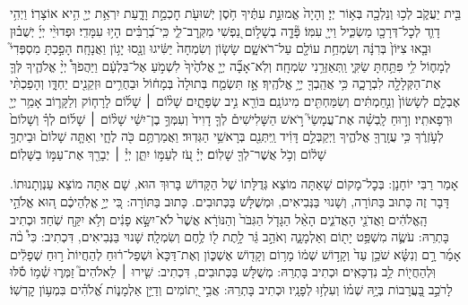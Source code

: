 \begin{footnotesize}
	בֵּ֖ית יַעֲקֹ֑ב לְכ֥וּ וְנֵלְכָ֖ה בְּא֥וֹר יְיָ׃
	וְהָיָה֙ אֱמוּנַ֣ת עִתֶּ֔יךָ חֹ֥סֶן יְשׁוּעֹ֖ת חׇכְמַ֣ת וָדָ֑עַת יִרְאַ֥ת יְיָ֖ הִ֥יא אוֹצָרֽוֹ׃
	וַיְהִ֥י דָוִ֛ד לְכׇל־דְּרָכָ֖ו מַשְׂכִּ֑יל וַייָ֖ עִמּֽוֹ׃
	פָּ֘דָ֤ה בְשָׁל֣וֹם נַ֭פְשִׁי מִקְּרׇב־לִ֑י כִּֽי־בְ֝רַבִּ֗ים הָי֥וּ עִמָּדִֽי׃
	וּפְדוּיֵ֨י יְיָ֜ יְשֻׁב֗וּן וּבָ֤אוּ צִיּוֹן֙ בְּרִנָּ֔ה וְשִׂמְחַ֥ת עוֹלָ֖ם עַל־רֹאשָׁ֑ם שָׂשׂ֤וֹן וְשִׂמְחָה֙ יַשִּׂ֔יגוּ וְנָ֖סוּ יָג֥וֹן וַאֲנָחָֽה׃
	הָפַ֣כְתָּ מִסְפְּדִי֮ לְמָח֢וֹל לִ֥י פִּתַּ֥חְתָּ שַׂקִּ֑י וַֽתְּאַזְּרֵ֥נִי שִׂמְחָֽה׃
	וְלֹֽא־אָבָ֞ה יְיָ֤ אֱלֹהֶ֙יךָ֙ לִשְׁמֹ֣עַ אֶל־בִּלְעָ֔ם וַיַּהֲפֹךְ֩ יְיָ֨ אֱלֹהֶ֧יךָ לְּךָ֛ אֶת־הַקְּלָלָ֖ה לִבְרָכָ֑ה כִּ֥י אֲהֵֽבְךָ֖ יְיָ֥ אֱלֹהֶֽיךָ׃
	אָ֣ז תִּשְׂמַ֤ח בְּתוּלָה֙ בְּמָח֔וֹל וּבַחֻרִ֥ים וּזְקֵנִ֖ים יַחְדָּ֑ו וְהָפַכְתִּ֨י אֶבְלָ֤ם לְשָׂשׂוֹן֙ וְנִ֣חַמְתִּ֔ים וְשִׂמַּחְתִּ֖ים מִיגוֹנָֽם׃
	בּוֹרֵ֖א נִ֣יב שְׂפָתָ֑יִם שָׁל֨וֹם ׀ שָׁל֜וֹם לָרָח֧וֹק וְלַקָּר֛וֹב אָמַ֥ר יְיָ֖ וּרְפָאתִֽיו׃
	וְר֣וּחַ לָֽבְשָׁ֗ה אֶת־עֲמָשַׂי֮ רֹ֣אשׁ הַשָּׁלִישִׁים֒ לְךָ֤ דָוִיד֙ וְעִמְּךָ֣ בֶן־יִשַׁ֔י שָׁל֨וֹם ׀ שָׁל֜וֹם לְךָ֗ וְשָׁלוֹם֙ לְעֹ֣זְרֶ֔ךָ כִּ֥י עֲזָֽרְךָ֖ אֱלֹהֶ֑יךָ וַיְקַבְּלֵ֣ם דָּוִ֔יד וַֽיִּתְּנֵ֖ם בְּרָאשֵׁ֥י הַגְּדֽוּד׃
	וַאֲמַרְתֶּ֥ם כֹּ֖ה לֶחָ֑י וְאַתָּ֤ה שָׁלוֹם֙ וּבֵיתְךָ֣ שָׁל֔וֹם וְכֹ֥ל אֲשֶׁר־לְךָ֖ שָׁלֽוֹם׃
	יְיָ֗ עֹ֭ז לְעַמּ֣וֹ יִתֵּ֑ן יְיָ֓ ׀ יְבָרֵ֖ךְ אֶת־עַמּ֣וֹ בַשָּׁלֽוֹם׃
	
	אָמַר רַבִּי יוֹחָנָן: בְּכׇל־מָקוֹם שָׁאַתָּה מוֹצֵא גְּדֻלָּתוֹ שֶׁל הַקָּדוֹשׁ בָּרוּךְ הוּא, שָׁם אַתָּה מוֹצֵא עַנְוְתָנוּתוֹ. דָּבָר זֶה כָּתוּב בַּתּוֹרָה, וְשָׁנוּי בַּנְּבִיאִים, וּמְשֻׁלָּשׁ בַּכְּתוּבִים. כָּתוּב בַּתּוֹרָה:%
	כִּ֚י יְיָ֣ אֱלֹֽהֵיכֶ֔ם ה֚וּא אֱלֹהֵ֣י הָֽאֱלֹהִ֔ים וַאֲדֹנֵ֖י הָאֲדֹנִ֑ים הָאֵ֨ל הַגָּדֹ֤ל הַגִּבֹּר֙ וְהַנּוֹרָ֔א אֲשֶׁר֙ לֹא־יִשָּׂ֣א פָנִ֔ים וְלֹ֥א יִקַּ֖ח שֹֽׁחַד׃
	וּכְתִיב בָּתְרֵהּ:
	עֹשֶׂ֛ה מִשְׁפַּ֥ט יָת֖וֹם וְאַלְמָנָ֑ה וְאֹהֵ֣ב גֵּ֔ר לָ֥תֶת ל֖וֹ לֶ֥חֶם וְשִׂמְלָֽה׃
	שָׁנוּי בַּנְּבִיאִים, דִּכְתִיב:%
	כִּי֩ כֹ֨ה אָמַ֜ר רָ֣ם וְנִשָּׂ֗א שֹׁכֵ֥ן עַד֙ וְקָד֣וֹשׁ שְׁמ֔וֹ מָר֥וֹם וְקָד֖וֹשׁ אֶשְׁכּ֑וֹן וְאֶת־דַּכָּא֙ וּשְׁפַל־ר֔וּחַ לְהַחֲיוֹת֙ ר֣וּחַ שְׁפָלִ֔ים וּֽלְהַחֲי֖וֹת לֵ֥ב נִדְכָּאִֽים׃
	וּכְתִיב בָּתְרֵהּ:
	מְשֻׁלָּשׁ בַּכְּתוּבִים, דִּכְתִיב:%
	שִׁ֤ירוּ ׀ לֵאלֹהִים֮ זַמְּר֢וּ שְׁ֫מ֥וֹ סֹ֡לּוּ לָרֹכֵ֣ב בָּ֭עֲרָבוֹת בְּיָ֥הּ שְׁמ֗וֹ וְעִלְז֥וּ לְפָנָֽיו׃
	וּכְתִיב בָּתְרֵהּ:
	אֲבִ֣י יְ֭תוֹמִים וְדַיַּ֣ן אַלְמָנ֑וֹת אֱ֝לֹהִ֗ים בִּמְע֥וֹן קׇדְשֽׁוֹ׃
	

\end{footnotesize}
